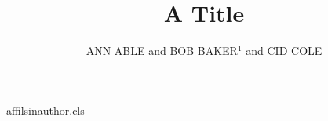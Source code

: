 \begin{filecontents*}[overwrite]{affilsinauthor.cls}
\def\affilfont{\small}
\def\author#1{\gdef\@author{#1}}
\def\affil#1{\gdef\@affil{#1}\ifx\@affil\@empty\else{\reset@font\affilfont\unskip,\ #1\vphantom{gy}\endgraf}\fi}\affil{}
\def\maketitle{\par{\Large\@title\par}{\noindent\@author\par}}
\end{filecontents*}
\documentclass{affilsinauthor}

\title{A Title}
\author{ANN ABLE and BOB BAKER$^1$ and CID COLE  }
\maketitle
Body.

